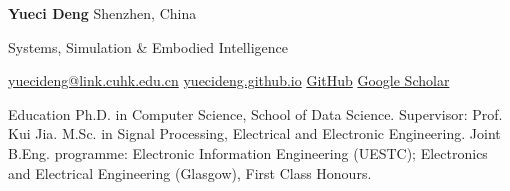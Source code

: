 \documentclass{resume}
\begin{document}
{\fontsize{24}{27}\selectfont\bfseries Yueci Deng}\hfill
{\small\color{cvMuted}Shenzhen, China}\par
\vspace{3pt}
{\sffamily\fontsize{9.5}{12}\selectfont\color{cvAccent}
Systems, Simulation \& Embodied Intelligence\par}
\vspace{4pt}
{\fontsize{9}{11}\selectfont
\href{mailto:yuecideng@link.cuhk.edu.cn}{yuecideng@link.cuhk.edu.cn}
\enspace\textbar\enspace\href{https://yuecideng.github.io/}{yuecideng.github.io}
\enspace\textbar\enspace\href{https://github.com/yuecideng}{GitHub}
\enspace\textbar\enspace\href{https://scholar.google.com/citations?user=URHu9IUAAAAJ}{Google Scholar}\par}

\begin{rSection}{Education}
{Ph.D. in Computer Science, School of Data Science. Supervisor: Prof. Kui Jia.}
{M.Sc. in Signal Processing, Electrical and Electronic Engineering.}
{Joint B.Eng. programme: Electronic Information Engineering (UESTC); Electronics and Electrical Engineering (Glasgow), First Class Honours.}
\end{rSection}
\end{document}
